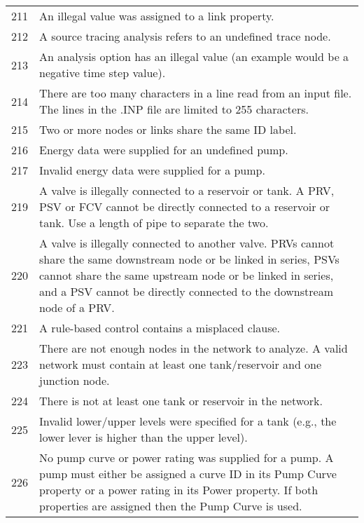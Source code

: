 \begin{longtable}{ c p{12cm}}
211& An illegal value was assigned to a link property.   \\[6pt]

212& A source tracing analysis refers to an undefined trace node.\\[6pt]

213& An analysis option has an illegal value (an example would be a negative time
step value).\\[6pt]

214& There are too many characters in a line read from an input file. The lines in
the .INP file are limited to 255 characters.\\[6pt]

215& Two or more nodes or links share the same ID label. \\[6pt]

216& Energy data were supplied for an undefined pump. \\[6pt]

217& Invalid energy data were supplied for a pump. \\[6pt]

219& A valve is illegally connected to a reservoir or tank. A PRV, PSV or FCV
cannot be directly connected to a reservoir or tank. Use a length of pipe to
separate the two.      \\[6pt]

220& A valve is illegally connected to another valve. PRVs cannot share the same
downstream node or be linked in series, PSVs cannot share the same
upstream node or be linked in series, and a PSV cannot be directly connected
to the downstream node of a PRV.\\[6pt]

221& A rule-based control contains a misplaced clause.\\[6pt]

223& There are not enough nodes in the network to analyze. A valid network must
contain at least one tank/reservoir and one junction node.\\[6pt]

224& There is not at least one tank or reservoir in the network.\\[6pt]

225& Invalid lower/upper levels were specified for a tank (e.g., the lower lever is
higher than the upper level).\\[6pt]

226& No pump curve or power rating was supplied for a pump. A pump must either
be assigned a curve ID in its Pump Curve property or a power rating in its
Power property. If both properties are assigned then the Pump Curve is used.\\[6pt]


\end{longtable}
